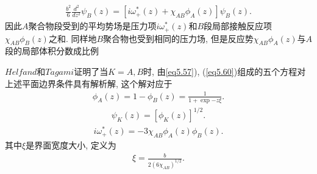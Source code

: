 \label{subsec.equations}
    \begin{equation}
        \begin{aligned}
            \frac{b^{2}}{6}\frac{d^{2}}{dz^{2}}\psi_{B}(z)=[i\omega^{*}_{+}(z)+\chi_{AB}\phi_{A}(z)]\psi_{B}(z).
        \end{aligned}
        \label{eq5.64}
    \end{equation}
因此$A$聚合物段受到的平均势场是压力项$i\omega^{*}_{+}(z)$和$B$段局部接触反应项$\chi_{AB}\phi_{B}(z)$之和.
同样地$B$聚合物也受到相同的压力场, 但是反应势$\chi_{AB}\phi_{A}(z)$与$A$段的局部体积分数成比例
\par
$Helfand$和$Tagami$证明了当$K=A, B$时, 由\ref{eq5.57}),
(\ref{eq5.60})组成的五个方程对上述平面边界条件具有解析解, 这个解对应于
\label{subsec.equations}
    \begin{equation}
        \begin{aligned}
            \phi_{A}(z)=1-\phi_{B}(z)=\frac{1}{1+\exp{-z\xi}}.
        \end{aligned}
        \label{eq5.65}
    \end{equation}
\label{subsec.equations}
    \begin{equation}
        \begin{aligned}
            \psi_{K}(z)=[\phi_{K}(z)]^{1/2}.
        \end{aligned}
        \label{eq5.66}
    \end{equation}
\label{subsec.equations}
    \begin{equation}
        \begin{aligned}
            i\omega^{*}_{+}(z)=-3\chi_{AB}\phi_{A}(z)\phi_{B}(z).
        \end{aligned}
        \label{eq5.67}
    \end{equation}
其中$\xi$是界面宽度大小, 定义为
\label{subsec.equations}
    \begin{equation}
        \begin{aligned}
            \xi=\frac{b}{2(6\chi_{AB})^{1/2}}.
        \end{aligned}
        \label{eq5.68}
    \end{equation}
\label{subsec.figure}
